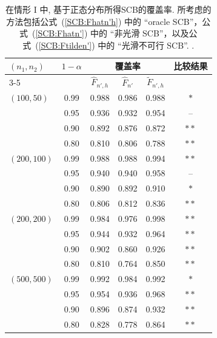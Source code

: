 \documentclass[a4paper,openay,14pt]{ctexbook}
\numberwithin{equation}{section}
\numberwithin{lem}{section}
\begin{document}
\begin{table}[tph]
\caption{在情形 I 中, 基于正态分布所得SCB的覆盖率. 所考虑的方法包括公式~(\ref{SCB:Fhatn'h}) 中的 ``oracle SCB''，公式~(\ref{SCB:Fhatn'}) 中的 ``非光滑 SCB''，以及公式~(\ref{SCB:Ftilden'}) 中的 ``光滑不可行 SCB''.
.}
\label{TAB:coveragerate-N(0,1)}
\centering
\begin{tabular}{lccccc}
\toprule
\multirow{2}{*}{$(n_1,n_2)$} & \multirow{2}{*}{$1-\alpha$} & \multicolumn{3}{c}{覆盖率} & \multirow{2}{*}{比较结果} \\ 
\cmidrule{3-5}
& & $\hat{F}_{n', h}$ & $\hat{F}_{n'}$ & $\tilde{F}_{n', h}$ & \\ 
\midrule
$(100,50)$  & 0.99 & 0.988 & 0.986 & 0.988 & $\ast$ \\
            & 0.95 & 0.936 & 0.932 & 0.954 & -- \\
            & 0.90 & 0.892 & 0.876 & 0.872 & $\ast\ast$ \\
            & 0.80 & 0.810 & 0.806 & 0.788 & $\ast\ast$ \\ \addlinespace
$(200,100)$ & 0.99 & 0.988 & 0.988 & 0.994 & $\ast\ast$ \\
            & 0.95 & 0.940 & 0.940 & 0.958 & -- \\
            & 0.90 & 0.890 & 0.892 & 0.910 & $\ast$ \\
            & 0.80 & 0.806 & 0.812 & 0.836 & $\ast\ast$ \\ \addlinespace
$(200,200)$ & 0.99 & 0.984 & 0.976 & 0.998 & $\ast\ast$ \\
            & 0.95 & 0.944 & 0.932 & 0.964 & $\ast\ast$ \\
            & 0.90 & 0.902 & 0.860 & 0.926 & $\ast\ast$ \\
            & 0.80 & 0.810 & 0.764 & 0.850 & $\ast\ast$ \\ \addlinespace
$(500,500)$ & 0.99 & 0.992 & 0.984 & 0.992 & $\ast$ \\
            & 0.95 & 0.954 & 0.936 & 0.968 & $\ast\ast$\\
            & 0.90 & 0.896 & 0.874 & 0.932 & $\ast\ast$ \\
            & 0.80 & 0.828 & 0.778 & 0.864 & $\ast\ast$\\ 
\bottomrule
\end{tabular}
\end{table}
\end{document}
